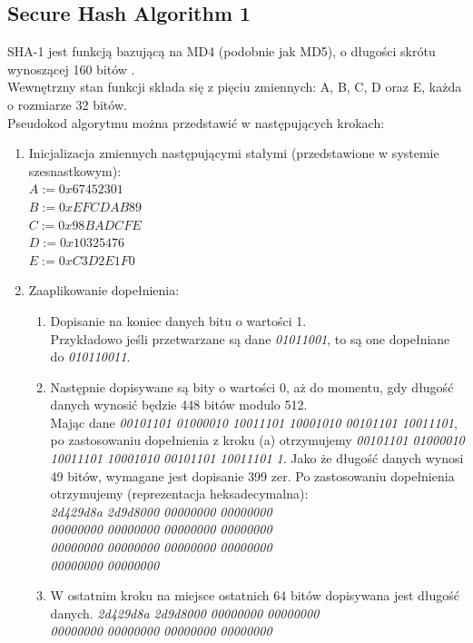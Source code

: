 \subsection{Secure Hash Algorithm 1}
SHA-1 jest funkcją bazującą na MD4 (podobnie jak MD5), o długości skrótu wynoszącej 160 bitów \cite{cryptoirf}. \\
Wewnętrzny stan funkcji składa się z pięciu zmiennych: A, B, C, D oraz E, każda o rozmiarze 32 bitów. \\
Pseudokod algorytmu można przedstawić w następujących krokach:
\begin{enumerate}
	\item Inicjalizacja zmiennych następującymi stałymi (przedstawione w systemie szesnastkowym): \\
		$A := 0x67452301$ \\
		$B := 0xEFCDAB89$ \\
		$C := 0x98BADCFE$ \\
		$D := 0x10325476$ \\
		$E := 0xC3D2E1F0$ 
	\item Zaaplikowanie dopełnienia:
		\begin{enumerate}
			\item Dopisanie na koniec danych bitu o wartości 1. \\ 
			Przykładowo jeśli przetwarzane są dane \textit{01011001}, to są one dopełniane do \textit{010110011}.
			\item Następnie dopisywane są bity o wartości 0, aż do momentu, gdy długość danych wynosić będzie 448 bitów modulo 512. \\
			Mając dane \textit{00101101 01000010 10011101 10001010 00101101 10011101}, po zastosowaniu dopełnienia z kroku (a) otrzymujemy \textit{00101101 01000010 10011101 10001010 00101101 10011101 1}. Jako że długość danych wynosi 49 bitów, wymagane jest dopisanie 399 zer. Po zastosowaniu dopełnienia otrzymujemy (reprezentacja heksadecymalna): \\
			\textit{2d429d8a 2d9d8000 00000000 00000000 \\ 
					00000000 00000000 00000000 00000000 \\ 
					00000000 00000000 00000000 00000000 \\ 
					00000000 00000000 }
			\item W ostatnim kroku na miejsce ostatnich 64 bitów dopisywana jest długość danych. 
			\textit{2d429d8a 2d9d8000 00000000 00000000 \\ 
					00000000 00000000 00000000 00000000 \\ 
}
\end{enumerate}
\end{enumerate}
